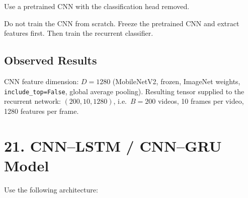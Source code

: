\documentclass[10pt]{article}
\begin{document}
Use a pretrained CNN with the classification head removed.

\begin{center}
\end{center}

Do not train the CNN from scratch. Freeze the pretrained CNN and extract
features first. Then train the recurrent classifier.

\subsection*{Observed Results}

CNN feature dimension: $D=1280$ (MobileNetV2, frozen, ImageNet weights,
\texttt{include\_top=False}, global average pooling). Resulting tensor
supplied to the recurrent network: $(200,10,1280)$, i.e.\ $B=200$ videos,
10 frames per video, 1280 features per frame.

\section*{21. CNN--LSTM / CNN--GRU Model}

Use the following architecture:

\begin{center}
\end{center}
\end{document}
